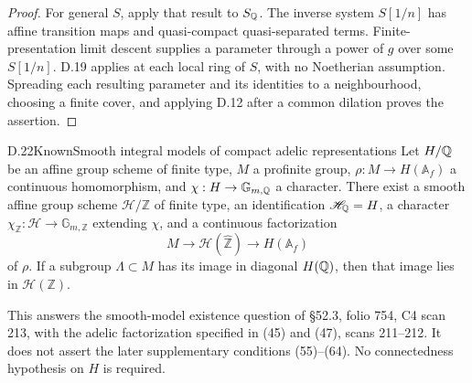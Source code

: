 \begin{proof}
For general $S$, apply that result to $S_{\mathbb Q}$. The inverse
system $S[1/n]$ has affine transition maps and quasi-compact
quasi-separated terms. Finite-presentation limit descent
supplies a parameter through a power of $g$ over some $S[1/n]$.
D.19 applies at each local ring of $S$, with no Noetherian
assumption. Spreading each resulting parameter and its identities
to a neighbourhood, choosing a finite cover, and applying D.12
after a common dilation proves the assertion.
\end{proof}

\begin{statement}{D.22}{Known}{Smooth integral models of compact adelic representations}
Let $H/\mathbb Q$ be an affine group scheme of finite type, $M$ a
profinite group, $\rho:M\to H(\mathbb A_f)$ a continuous
homomorphism, and $\chi:H\to\mathbb G_{m,\mathbb Q}$ a character.
There exist a smooth affine group scheme $\mathscr H/\mathbb Z$
of finite type, an identification $\mathscr H_{\mathbb Q}=H$, a
character $\chi_{\mathbb Z}:\mathscr H\to\mathbb G_{m,\mathbb Z}$
extending $\chi$, and a continuous factorization
\[
                  M\longrightarrow\mathscr H(\widehat{\mathbb Z})
                    \longrightarrow H(\mathbb A_f)
\]
of $\rho$. If a subgroup $\Lambda\subset M$ has its image
in diagonal $H(\mathbb Q)$, then that image lies in $\mathscr H(\mathbb Z)$.

This answers the smooth-model existence question of \S52.3,
folio 754, C4 scan 213, with the adelic factorization specified
in (45) and (47), scans 211--212. It does not assert the later
supplementary conditions (55)--(64). No connectedness hypothesis
on $H$ is required.
\end{statement}
